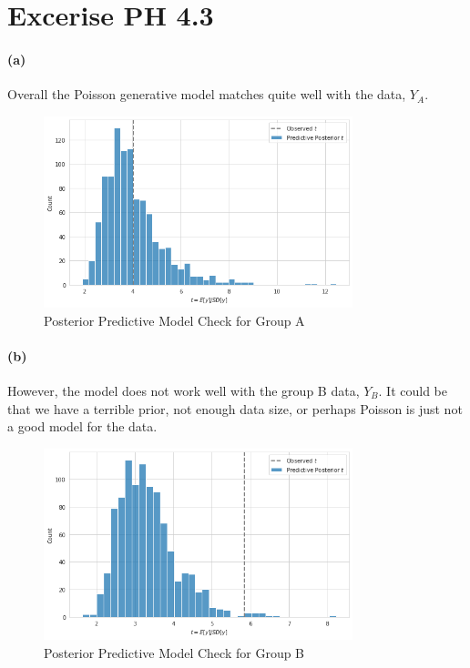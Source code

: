 \documentclass[11pt, letterpaper]{article}
\begin{document}
\section{Excerise PH 4.3}
\paragraph{(a)}
Overall the Poisson generative model matches quite well with the data, $Y_A$. 

\begin{figure}[!h]
  \centering
  \includegraphics[width=0.8\textwidth]{4.3.a.png}
  \captionsetup{justification=centering}
  \caption{Posterior Predictive Model Check for Group A}
\end{figure}

\paragraph{(b)}
However, the model does not work well with the group B data, $Y_B$. It could be that we have a terrible prior,
not enough data size, or perhaps Poisson is just not a good model for the data.

\begin{figure}[!h]
  \centering
  \includegraphics[width=0.8\textwidth]{4.3.b.png}
  \captionsetup{justification=centering}
  \caption{Posterior Predictive Model Check for Group B}
\end{figure}
\newpage
\end{document}

